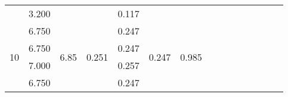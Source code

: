 \documentclass[a4paper,12pt]{article}
\begin{document}
\begin{table}[htp]
\begin{tabular}{|c|c|c|c|c|c|c|c|c|c|c|c|c|c|c|}
                       & 3.200                   &                                       &                        & 0.117 &                        &                        &                        &                               &                                                            &                                                            &                         &                         &                         &                             \\ \cline{1-7}
\multirow{5}{*}{10}    & 6.750                   & \multirow{5}{*}{6.85}                 & \multirow{5}{*}{0.251} & 0.247 & \multirow{5}{*}{0.247} & \multirow{5}{*}{0.985} &                        &                               &                                                            &                                                            &                         &                         &                         &                             \\ \cline{2-2} \cline{5-5}
                       & 6.750                   &                                       &                        & 0.247 &                        &                        &                        &                               &                                                            &                                                            &                         &                         &                         &                             \\ \cline{2-2} \cline{5-5}
                       & 7.000                   &                                       &                        & 0.257 &                        &                        &                        &                               &                                                            &                                                            &                         &                         &                         &                             \\ \cline{2-2} \cline{5-5}
                       & 6.750                   &                                       &                        & 0.247 &                        &                        &                        &                               &                                                            &                                                            &                         &                         &                         &                             \\ \cline{2-2} \cline{5-5}

\end{tabular}
\end{table}
\end{document}
